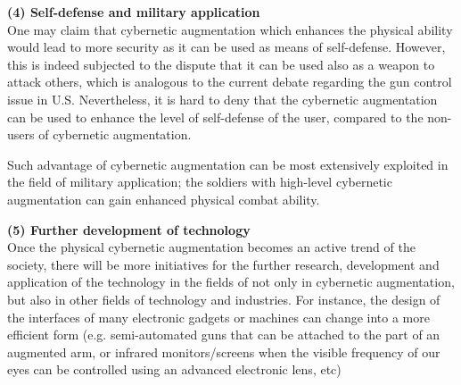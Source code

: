 {\bf (4) Self-defense and military application}\\
One may claim that cybernetic augmentation which enhances the physical ability would lead to more security as it can be used as means of self-defense. However, this is indeed subjected to the dispute that it can be used also as a weapon to attack others, which is analogous to the current debate regarding the gun control issue in U.S. Nevertheless, it is hard to deny that the cybernetic augmentation can be used to enhance the level of self-defense of the user, compared to the non-users of cybernetic augmentation.

Such advantage of cybernetic augmentation can be most extensively exploited in the field of military application; the soldiers with high-level cybernetic augmentation can gain enhanced physical combat ability.

{\bf (5) Further development of technology}\\
Once the physical cybernetic augmentation becomes an active trend of the society, there will be more initiatives for the further research, development and application of the technology in the fields of not only in cybernetic augmentation, but also in other fields of technology and industries. For instance, the design of the interfaces of many electronic gadgets or machines can change into a more efficient form (e.g. semi-automated guns that can be attached to the part of an augmented arm, or infrared monitors/screens when the visible frequency of our eyes can be controlled using an advanced electronic lens, etc)


